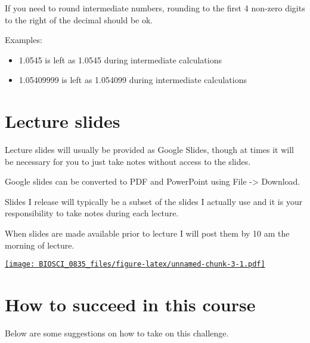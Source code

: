 \documentclass[
]{book}
\providecommand{\tightlist}{%
  \setlength{\itemsep}{0pt}\setlength{\parskip}{0pt}}
\begin{document}
If you need to round intermediate numbers, rounding to the first 4 non-zero digits to the right of the decimal should be ok.

Examples:

\begin{itemize}
\tightlist
\item
  1.0545 is left as 1.0545 during intermediate calculations
\item
  1.05409999 is left as 1.054099 during intermediate calculations
\end{itemize}

\hypertarget{lecture-slides}{%
\chapter{Lecture slides}\label{lecture-slides}}

Lecture slides will usually be provided as Google Slides, though at times it will be necessary for you to just take notes without access to the slides.

Google slides can be converted to PDF and PowerPoint using File -\textgreater{} Download.

Slides I release will typically be a subset of the slides I actually use and it is your responsibility to take notes during each lecture.

When slides are made available prior to lecture I will post them by 10 am the morning of lecture.

\href{https://upload.wikimedia.org/wikipedia/commons/thumb/1/16/Google_Slides_2020_Logo.svg/174px-Google_Slides_2020_Logo.svg.png}{\texttt{[image: BIOSCI\_0835\_files/figure-latex/unnamed-chunk-3-1.pdf]}}

\hypertarget{how-to-succeed-in-this-course}{%
\chapter{How to succeed in this course}\label{how-to-succeed-in-this-course}}

Below are some suggestions on how to take on this challenge.
\end{document}
